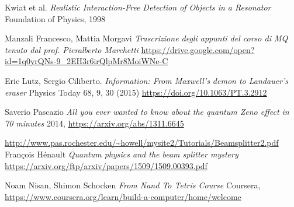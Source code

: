 \documentclass[12pt]{report} %
\DeclareRobustCommand{\MQ}{{\small\textsc{MQ}}\xspace}
\theoremstyle{plain}
\theoremstyle{definition}
\theoremstyle{remark}
\begin{document}
\clearpage
\begin{thebibliography}{9}
Kwiat et al.
\textit{Realistic Interaction-Free Detection of Objects in a Resonator}
Foundation of Physics, 1998

Manzali Francesco, Mattia Morgavi
\textit{Trascrizione degli appunti del corso di \MQ tenuto dal prof. Pieralberto Marchetti}
\url{https://drive.google.com/open?id=1q0yrQNs-9_2EH3r6irQlpMr8MoiWNe-C}

Eric Lutz, Sergio Ciliberto.
\textit{Information: From Maxwell’s demon to Landauer’s eraser}
Physics Today 68, 9, 30 (2015) \url{https://doi.org/10.1063/PT.3.2912}

Saverio Pascazio
\textit{All you ever wanted to know about the quantum Zeno effect in 70 minutes}
2014, \url{https://arxiv.org/abs/1311.6645}

\url{http://www.pas.rochester.edu/~howell/mysite2/Tutorials/Beamsplitter2.pdf}
François Hénault
\textit{Quantum physics and the beam splitter mystery}
\url{https://arxiv.org/ftp/arxiv/papers/1509/1509.00393.pdf}

Noam Nisan, Shimon Schocken
\textit{From Nand To Tetris Course}
Coursera, \url{https://www.coursera.org/learn/build-a-computer/home/welcome}
\end{thebibliography}

\printindex
\end{document}
